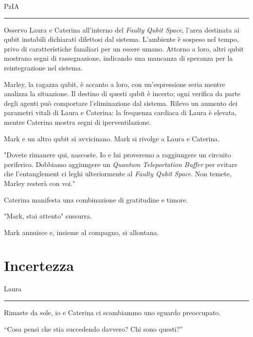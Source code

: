 \vspace{1em}
\begin{center}PzIA\end{center}
\hrule
\vspace{1em}
Osservo Laura e Caterina all'interno del \textit{Faulty Qubit Space}, l'area destinata ai qubit instabili dichiarati difettosi dal sistema. L'ambiente è sospeso nel tempo, privo di caratteristiche familiari per un essere umano. Attorno a loro, altri qubit mostrano segni di rassegnazione, indicando una mancanza di speranza per la reintegrazione nel sistema.

Marley, la ragazza qubit, è accanto a loro, con un'espressione seria mentre analizza la situazione. Il destino di questi qubit è incerto; ogni verifica da parte degli agenti può comportare l'eliminazione dal sistema. Rilevo un aumento dei parametri vitali di Laura e Caterina: la frequenza cardiaca di Laura è elevata, mentre Caterina mostra segni di iperventilazione.

Mark e un altro qubit si avvicinano. Mark si rivolge a Laura e Caterina.

\begin{dialogue}
 "Dovete rimanere qui, nascoste. Io e lui proveremo a raggiungere un circuito periferico. Dobbiamo aggiungere un \textit{Quantum Teleportation Buffer} per evitare che l'entanglement ci leghi ulteriormente al \textit{Faulty Qubit Space}. Non temete, Marley resterà con voi." 
\end{dialogue}

Caterina manifesta una combinazione di gratitudine e timore.
\begin{dialogue}
 "Mark, stai attento" sussurra.
\end{dialogue}
Mark annuisce e, insieme al compagno, si allontana.
\newpage
\section{Incertezza}
\vspace{1em}
\begin{center}Laura\end{center}
\hrule
\vspace{1em}
Rimaste da sole, io e Caterina ci scambiammo uno sguardo preoccupato. 

\begin{dialogue}
 \enquote{Cosa pensi che stia succedendo davvero? Chi sono questi?}
\end{dialogue}

